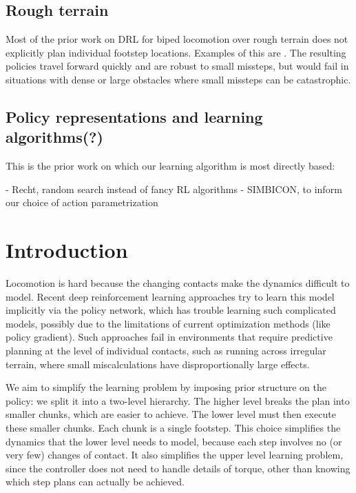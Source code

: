 \documentclass[a4paper]{article}
\begin{document}
\subsection{Rough terrain}

Most of the prior work on DRL for biped locomotion over rough terrain does not explicitly plan individual footstep locations. Examples of this are \cite{peng2018deepmimic, heess2017emergence, peng2016terrain}. The resulting policies travel forward quickly and are robust to small missteps, but would fail in situations with dense or large obstacles where small missteps can be catastrophic.

\subsection{Policy representations and learning algorithms(?)}

This is the prior work on which our learning algorithm is most directly based:

- Recht, random search instead of fancy RL algorithms
- SIMBICON, to inform our choice of action parametrization



\section{Introduction}

Locomotion is hard because the changing contacts make the dynamics difficult to model.
Recent deep reinforcement learning approaches try to learn this model implicitly via the policy network, which has trouble learning such complicated models, possibly due to the limitations of current optimization methods (like policy gradient).
Such approaches fail in environments that require predictive planning at the level of individual contacts, such as running across irregular terrain, where small miscalculations have disproportionally large effects.

We aim to simplify the learning problem by imposing prior structure on the policy: we split it into a two-level hierarchy.
The higher level breaks the plan into smaller chunks, which are easier to achieve.
The lower level must then execute these smaller chunks.
Each chunk is a single footstep.
This choice simplifies the dynamics that the lower level needs to model, because each step involves no (or very few) changes of contact.
It also simplifies the upper level learning problem, since the controller does not need to handle details of torque, other than knowing which step plans can actually be achieved.
\end{document}
